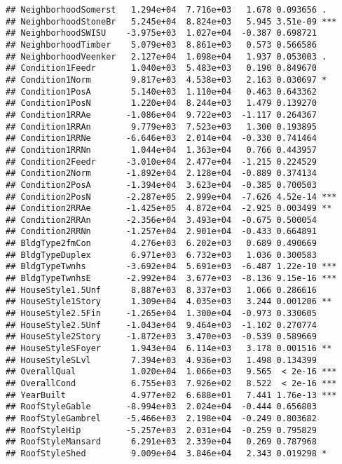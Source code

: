 \documentclass[
]{article}
\begin{document}
\begin{verbatim}
## NeighborhoodSomerst   1.294e+04  7.716e+03   1.678 0.093656 .  
## NeighborhoodStoneBr   5.245e+04  8.824e+03   5.945 3.51e-09 ***
## NeighborhoodSWISU    -3.975e+03  1.027e+04  -0.387 0.698721    
## NeighborhoodTimber    5.079e+03  8.861e+03   0.573 0.566586    
## NeighborhoodVeenker   2.127e+04  1.098e+04   1.937 0.053003 .  
## Condition1Feedr       1.040e+03  5.483e+03   0.190 0.849670    
## Condition1Norm        9.817e+03  4.538e+03   2.163 0.030697 *  
## Condition1PosA        5.140e+03  1.110e+04   0.463 0.643362    
## Condition1PosN        1.220e+04  8.244e+03   1.479 0.139270    
## Condition1RRAe       -1.086e+04  9.722e+03  -1.117 0.264367    
## Condition1RRAn        9.779e+03  7.523e+03   1.300 0.193895    
## Condition1RRNe       -6.646e+03  2.014e+04  -0.330 0.741464    
## Condition1RRNn        1.044e+04  1.363e+04   0.766 0.443957    
## Condition2Feedr      -3.010e+04  2.477e+04  -1.215 0.224529    
## Condition2Norm       -1.892e+04  2.128e+04  -0.889 0.374134    
## Condition2PosA       -1.394e+04  3.623e+04  -0.385 0.700503    
## Condition2PosN       -2.287e+05  2.999e+04  -7.626 4.52e-14 ***
## Condition2RRAe       -1.425e+05  4.872e+04  -2.925 0.003499 ** 
## Condition2RRAn       -2.356e+04  3.493e+04  -0.675 0.500054    
## Condition2RRNn       -1.257e+04  2.901e+04  -0.433 0.664891    
## BldgType2fmCon        4.276e+03  6.202e+03   0.689 0.490669    
## BldgTypeDuplex        6.971e+03  6.732e+03   1.036 0.300583    
## BldgTypeTwnhs        -3.692e+04  5.691e+03  -6.487 1.22e-10 ***
## BldgTypeTwnhsE       -2.992e+04  3.677e+03  -8.136 9.15e-16 ***
## HouseStyle1.5Unf      8.887e+03  8.337e+03   1.066 0.286616    
## HouseStyle1Story      1.309e+04  4.035e+03   3.244 0.001206 ** 
## HouseStyle2.5Fin     -1.265e+04  1.300e+04  -0.973 0.330605    
## HouseStyle2.5Unf     -1.043e+04  9.464e+03  -1.102 0.270774    
## HouseStyle2Story     -1.872e+03  3.470e+03  -0.539 0.589669    
## HouseStyleSFoyer      1.943e+04  6.114e+03   3.178 0.001516 ** 
## HouseStyleSLvl        7.394e+03  4.936e+03   1.498 0.134399    
## OverallQual           1.020e+04  1.066e+03   9.565  < 2e-16 ***
## OverallCond           6.755e+03  7.926e+02   8.522  < 2e-16 ***
## YearBuilt             4.977e+02  6.688e+01   7.441 1.76e-13 ***
## RoofStyleGable       -8.994e+03  2.024e+04  -0.444 0.656803    
## RoofStyleGambrel     -5.466e+03  2.198e+04  -0.249 0.803682    
## RoofStyleHip         -5.257e+03  2.031e+04  -0.259 0.795829    
## RoofStyleMansard      6.291e+03  2.339e+04   0.269 0.787968    
## RoofStyleShed         9.009e+04  3.846e+04   2.343 0.019298 *  

\end{verbatim}
\end{document}
